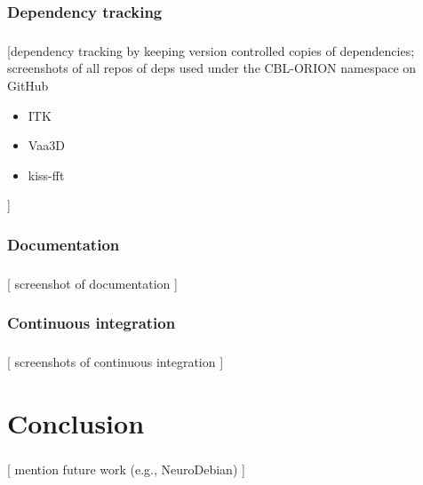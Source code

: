\documentclass{beamer}
\begin{document}
\subsubsection{Dependency tracking}
\begin{frame}\frametitle{\subsubsecname}
	[dependency tracking by keeping version controlled copies
		of dependencies; screenshots of all repos of deps used under the CBL-ORION
	namespace on GitHub
	\begin{itemize}
		\item ITK
		\item Vaa3D
		\item kiss-fft
	\end{itemize}
	]
\end{frame}

\subsubsection{Documentation}
\begin{frame}\frametitle{\subsubsecname}
	[
		screenshot of documentation
	]
\end{frame}


\subsubsection{Continuous integration}
\begin{frame}\frametitle{\subsecname}
	[
		{screenshots of continuous integration}
	]
\end{frame}


\section{Conclusion}
\begin{frame}\frametitle{\secname}
	[
		mention future work (e.g., NeuroDebian)
	]
\end{frame}


\end{document}
